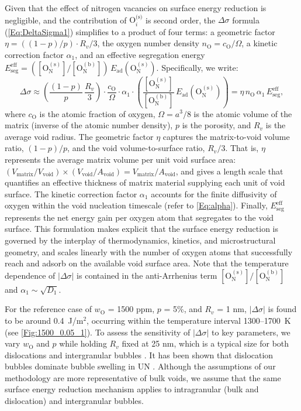 \documentclass[preprint,12pt,sort&compress]{elsarticle}
\newcommand{\?}{\stackrel{?}{=}}
\begin{document}
Given that the effect of nitrogen vacancies on surface energy reduction is negligible, and the contribution of $\text{O}_i^{\text{(s)}}$ is second order, the $\Delta \sigma$ formula (\cref{Eq:DeltaSigma1}) simplifies to a product of four terms: a geometric factor $\eta = ((1 - p)/p) \cdot R_v/3$, the oxygen number density $n_\text{O} = c_\text{O} / \Omega$, a kinetic correction factor $\alpha_1$, and an effective segregation energy $E_\text{seg}^\text{eff} = ( [\text{O}_\text{N}^{(\text{s})}] / [\text{O}_\text{N}^{(\text{b})}] ) \, E_\text{ad}(\text{O}_\text{N}^{(\text{s})})$. Specifically, we write:
\begin{equation}
\Delta \sigma \approx \left( \frac{(1 - p)}{p} \, \frac{R_v}{3} \right) \cdot \frac{c_\text{O}}{\Omega} \cdot \alpha_1 \cdot \left( \frac{ [ \text{O}_\text{N}^{(\text{s})} ] }{ [ \text{O}_\text{N}^{(\text{b})} ] } \, E_\text{ad}( \text{O}_\text{N}^{(\text{s})} ) \right) = \eta \, n_\text{O} \, \alpha_1 \, E_\text{seg}^\text{eff},
\label{Eq:DeltaSigmaSimple}
\end{equation}
where $c_\text{O}$ is the atomic fraction of oxygen, $\Omega = a^3/8$ is the atomic volume of the matrix (inverse of the atomic number density), $p$ is the porosity, and $R_v$ is the average void radius. The geometric factor $\eta$ captures the matrix-to-void volume ratio, $(1-p)/p$, and the void volume-to-surface ratio, $R_v/3$. That is, $\eta$ represents the average matrix volume per unit void surface area: $(V_\text{matrix}/V_\text{void}) \times (V_\text{void}/A_\text{void}) = V_\text{matrix} / A_\text{void}$, and gives a length scale that quantifies an effective thickness of matrix material 
supplying each unit of void surface. The kinetic correction factor $\alpha_1$ accounts for the finite diffusivity of oxygen within the void nucleation timescale (refer to \cref{Eq:alpha}). Finally, $E_\text{seg}^\text{eff}$ represents the net energy gain per oxygen atom that segregates to the void surface. This formulation makes explicit that the surface energy reduction is governed by the interplay of thermodynamics, kinetics, and microstructural geometry, and scales linearly with the number of oxygen atoms that successfully reach and adsorb on the available void surface area. Note that the temperature dependence of $|\Delta \sigma|$ is contained in the anti-Arrhenius term $[\text{O}_\text{N}^{(\text{s})}] / [\text{O}_\text{N}^{(\text{b})}]$ and $\alpha_1 \sim \sqrt{D_1}$.



For the reference case of $w_\text{O}$ = 1500 ppm, $p$ = 5\%, and $R_v$ = 1 nm, $|\Delta \sigma|$ is found to be around 0.4~J/m$^2$, occurring within the temperature interval 1300--1700~K (see \cref{Fig:1500_0.05_1}). To assess the sensitivity of $|\Delta \sigma|$ to key parameters, we vary $w_\text{O}$ and $p$ while holding $R_v$ fixed at 25 nm, which is a typical size for both dislocations and intergranular bubbles \cite{Colin1983}. It has been shown that dislocation bubbles dominate bubble swelling in UN \cite{Ronchi1975,Ronchi1978,Rizk2025}. Although the assumptions of our methodology are more representative of bulk voids, we assume that the same surface energy reduction mechanism applies to intragranular (bulk and dislocation) and intergranular bubbles.
\end{document}

